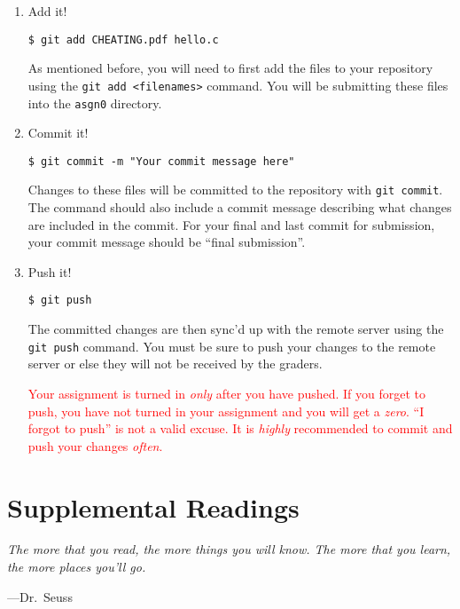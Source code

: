 \documentclass[11pt]{article}
\newcommand\asgn[0]{asgn0}
\begin{document}
\begin{enumerate}
  \item Add it!

\begin{lstlisting}[style=bashstyle]
  $ git add CHEATING.pdf hello.c
\end{lstlisting}

    As mentioned before, you will need to first add the files to
    your repository using the \texttt{git add <filenames>} command. You
    will be submitting these files into the \texttt{\asgn}
    directory.

  \item Commit it!

\begin{lstlisting}[style=bashstyle]
  $ git commit -m "Your commit message here"
\end{lstlisting}

  Changes to these files will be committed to the repository with \texttt{git
  commit}. The command should also include a commit message describing what
  changes are included in the commit. For your final and last commit for
  submission, your commit message should be ``final submission''.

  \item Push it!

\begin{lstlisting}[style=bashstyle]
  $ git push
\end{lstlisting}

  The committed changes are then sync'd up with the remote server
  using the \texttt{git push} command. You must be sure to push your
  changes to the remote server or else they will not be received by
  the graders.

  \textcolor{red}{Your assignment is turned in \emph{only} after you have
  pushed. If you forget to push, you have not turned in your assignment and you
  will get a \emph{zero}. ``I forgot to push'' is not a valid excuse. It is
  \emph{highly} recommended to commit and push your changes \emph{often}.}
\end{enumerate}

\section{Supplemental Readings}

\epigraph{\emph{The more that you read, the more things you will know. The
more that you learn, the more places you'll go.}}{---Dr.\ Seuss}\noindent
\end{document}
